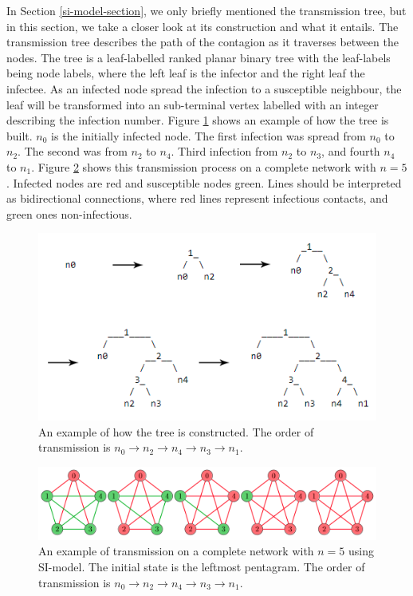 \documentclass[12pt]{article} %
\numberwithin{equation}{section}
\begin{document}
In Section \ref{si-model-section}, we only briefly mentioned the transmission tree, but in this section, we take a closer look at its construction and what it entails. The transmission tree describes the path of the contagion as it traverses between the nodes. The tree is a leaf-labelled ranked planar binary tree with the leaf-labels being node labels, where the left leaf is the infector and the right leaf the infectee. As an infected node spread the infection to a susceptible neighbour, the leaf will be transformed into an sub-terminal vertex labelled with an integer describing the infection number. Figure \ref{treeexample} shows an example of how the tree is built. $n_0$ is the initially infected node. The first infection was spread from $n_0$ to $n_2$. The second was from $n_2$ to $n_4$. Third infection from $n_2$ to $n_3$, and fourth $n_4$ to $n_1$. Figure \ref{transexample} shows this transmission process on a complete network with $n=5$. Infected nodes are red and susceptible nodes green. Lines should be interpreted as bidirectional connections, where red lines represent infectious contacts, and green ones non-infectious. 
\begin{figure}[H]
    \centering
    \includegraphics[scale=0.5]{treeexample.png}   
    \caption{An example of how the tree is constructed. The order of transmission is $n_0\rightarrow n_2\rightarrow n_4\rightarrow n_3\rightarrow n_1$.}
    \label{treeexample}
\end{figure}
\begin{figure}[H]
    \centering
    \includegraphics[scale=0.35]{exTrans.png}   
    \caption{An example of transmission on a complete network with $n=5$ using SI-model. The initial state is the leftmost pentagram. The order of transmission is $n_0\rightarrow n_2\rightarrow n_4\rightarrow n_3\rightarrow n_1$.}
    \label{transexample}
\end{figure}
\end{document}

